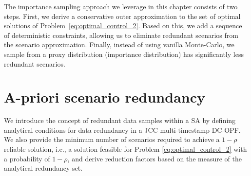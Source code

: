 %
The importance sampling approach we leverage in this chapter consists of two steps. First, we derive a conservative outer approximation to the set of optimal solutions of Problem~\eqref{eq:optimal_control_2}. Based on this, we add a sequence of deterministic constraints, allowing us to eliminate redundant scenarios from the scenario approximation. Finally, instead of using vanilla Monte-Carlo, we sample from a proxy distribution (importance distribution) has significantly less redundant scenarios. %
%
%
\section{A-priori scenario redundancy}
\label{sec:apriori}
We introduce the concept of redundant data samples within a SA by defining analytical conditions for data redundancy in a JCC multi-timestamp DC-OPF. We also provide the minimum number of scenarios required to achieve a $1 - \rho$ reliable solution, i.e., a solution feasible for Problem \eqref{eq:optimal_control_2} with a probability of $1 - \rho$, and derive reduction factors based on the measure of the analytical redundancy set. %
